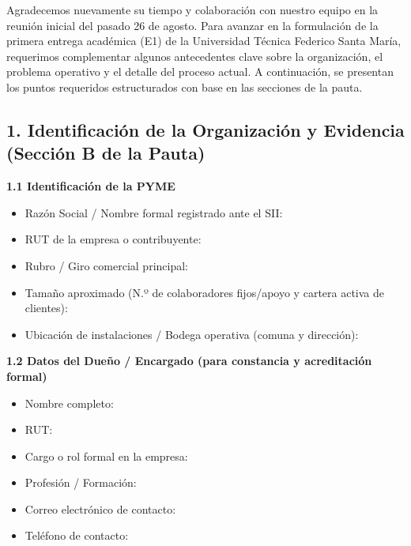 \documentclass[10pt,a4paper]{article}
\begin{document}
Agradecemos nuevamente su tiempo y colaboración con nuestro equipo en la reunión inicial del pasado 26 de agosto. Para avanzar en la formulación de la primera entrega académica (E1) de la Universidad Técnica Federico Santa María, requerimos complementar algunos antecedentes clave sobre la organización, el problema operativo y el detalle del proceso actual. A continuación, se presentan los puntos requeridos estructurados con base en las secciones de la pauta.

\subsection*{1. Identificación de la Organización y Evidencia (Sección B de la Pauta)}

\textbf{1.1 Identificación de la PYME}

\begin{itemize}[leftmargin=1.2cm]
    \item Razón Social / Nombre formal registrado ante el SII: \underline{\hspace{7cm}}
    \item RUT de la empresa o contribuyente: \underline{\hspace{7cm}}
    \item Rubro / Giro comercial principal: \underline{\hspace{7cm}}
    \item Tamaño aproximado (N.º de colaboradores fijos/apoyo y cartera activa de clientes): \underline{\hspace{7cm}}
    \item Ubicación de instalaciones / Bodega operativa (comuna y dirección): \underline{\hspace{7cm}}
\end{itemize}

\textbf{1.2 Datos del Dueño / Encargado (para constancia y acreditación formal)}

\begin{itemize}[leftmargin=1.2cm]
    \item Nombre completo: \underline{\hspace{7cm}}
    \item RUT: \underline{\hspace{7cm}}
    \item Cargo o rol formal en la empresa: \underline{\hspace{7cm}}
    \item Profesión / Formación: \underline{\hspace{7cm}}
    \item Correo electrónico de contacto: \underline{\hspace{7cm}}
    \item Teléfono de contacto: \underline{\hspace{7cm}}
\end{itemize}
\end{document}
